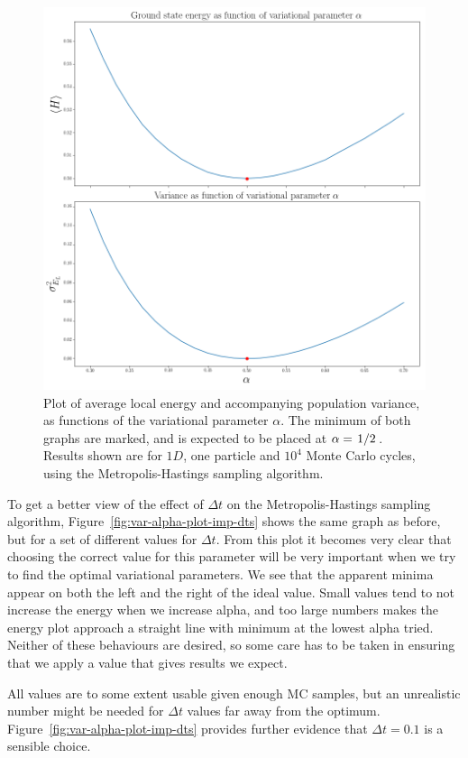 \documentclass[twocolumn]{article}
\begin{document}
\begin{figure}[ht]
    \centering
    \includegraphics[width=0.9\linewidth]{../results/var-alpha-plot-imp-10000.png}
    \caption{Plot of average local energy and accompanying population variance,
    as functions of the variational parameter $\alpha$. The minimum of both
    graphs are marked, and is expected to be placed at
    $\alpha=\flatfrac{1}{2}$. Results shown are for $1D$, one particle and
    $10^{4}$ Monte Carlo cycles, using the Metropolis-Hastings sampling
    algorithm.}
    \label{fig:var-alpha-plot-imp}
\end{figure}


To get a better view of the effect of $\Delta t$ on the Metropolis-Hastings
sampling algorithm, Figure~\ref{fig:var-alpha-plot-imp-dts} shows the same graph
as before, but for a set of different values for $\Delta t$. From this plot it
becomes very clear that choosing the correct value for this parameter will be
very important when we try to find the optimal variational parameters. We see
that the apparent minima appear on both the left and the right of the ideal
value. Small values tend to not increase the energy when we increase alpha, and
too large numbers makes the energy plot approach a straight line with minimum at
the lowest alpha tried. Neither of these behaviours are desired, so some care
has to be taken in ensuring that we apply a value that gives results we expect.

All values are to some extent usable given enough MC samples, but an unrealistic
number might be needed for $\Delta t$ values far away from the optimum.
Figure~\ref{fig:var-alpha-plot-imp-dts} provides further evidence that $\Delta
t=0.1$ is a sensible choice.
\end{document}
